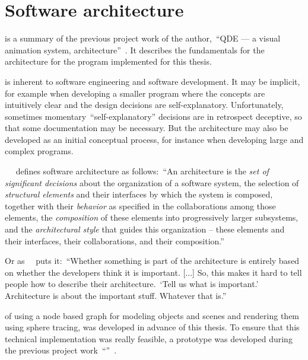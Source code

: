 \documentclass[%
    a4paper,    %
    justified,  %
    nobib,      %
    openany     %
]{tufte-book}
\begin{document}
\section{Software architecture}
\label{soarch}

 is a summary of the previous project work of the
author,~\enquote{QDE --- a visual animation system,
architecture}~\cite{osterwalder-qde-2016}. It describes the fundamentals for the
architecture for the program implemented for this thesis.

 is inherent to software engineering and
software development. It may be implicit, for example when developing a smaller
program where the concepts are intuitively clear and the design decisions are
self-explanatory. Unfortunately, sometimes momentary~\enquote{self-explanatory}
decisions are in retrospect deceptive, so that some documentation may be
necessary. But the architecture may also be developed as an initial conceptual
process, for instance when developing large and complex programs.

~\citeauthor{kruchten_rup_2003}~\cite{kruchten_rup_2003} defines
software architecture as follows:~\enquote{An architecture is the \textit{set of
significant decisions} about the organization of a software system, the
selection of \textit{structural elements} and their interfaces by which the
system is composed, together with their \textit{behavior} as specified in the
collaborations among those elements, the \textit{composition} of these elements
into progressively larger subsystems, and the \textit{architectural style} that
guides this organization -- these elements and their interfaces, their
collaborations, and their composition.}

Or as~\citeauthor{fowler_architect_2003}~\cite{folwer_architect_2003} puts
it:~\enquote{Whether something is part of the architecture is entirely based on
whether the developers think it is important. [...] So, this makes it hard to
tell people how to describe their architecture.~\enquote{Tell us what is
important.} Architecture is about the important stuff. Whatever that
is.}

 of using a node based graph for
modeling objects and scenes and rendering them using sphere tracing, was
developed in advance of this thesis. To ensure that this technical
implementation was really feasible, a prototype was developed during the
previous project
work~\enquote{}~\cite{osterwalder-volume-2016}.
\end{document}
